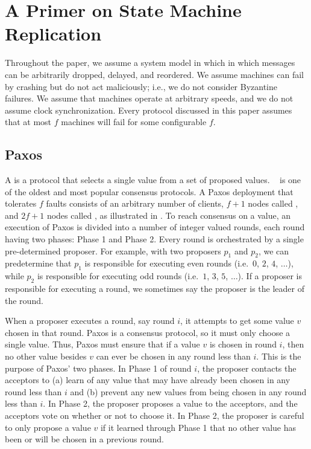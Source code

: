 \section{A Primer on State Machine Replication}

Throughout the paper, we assume a system model in which in which messages can
be arbitrarily dropped, delayed, and reordered. We assume machines can fail by
crashing but do not act maliciously; i.e., we do not consider Byzantine
failures. We assume that machines operate at arbitrary speeds, and we do not
assume clock synchronization. Every protocol discussed in this paper assumes
that at most $f$ machines will fail for some configurable $f$.

\subsection{Paxos}
A  is a protocol that selects a single value from a
set of proposed values. ~\cite{lamport1998part,
lamport2001paxos} is one of the oldest and most popular consensus protocols. A
Paxos deployment that tolerates $f$ faults consists of an arbitrary number of
clients, $f+1$ nodes called , and $2f+1$ nodes called
, as illustrated in .
%
To reach consensus on a value, an execution of Paxos is divided into a number
of integer valued rounds, each round having two phases: Phase 1 and Phase 2.
Every round is orchestrated by a single pre-determined proposer. For example,
with two proposers $p_1$ and $p_2$, we can predetermine that $p_1$ is
responsible for executing even rounds (i.e.\ $0$, $2$, $4$, $\ldots$), while
$p_2$ is responsible for executing odd rounds (i.e.\ $1$, $3$, $5$, $\ldots$).
If a proposer is responsible for executing a round, we sometimes say the
proposer is the leader of the round.

{}

When a proposer executes a round, say round $i$, it attempts to get some value
$v$ chosen in that round. Paxos is a consensus protocol, so it must only choose
a single value. Thus, Paxos must ensure that if a value $v$ is chosen in round
$i$, then no other value besides $v$ can ever be chosen in any round less than
$i$. This is the purpose of Paxos' two phases. In Phase 1 of round $i$, the
proposer contacts the acceptors to (a) learn of any value that may have already
been chosen in any round less than $i$ and (b) prevent any new values from
being chosen in any round less than $i$. In Phase 2, the proposer proposes a
value to the acceptors, and the acceptors vote on whether or not to choose it.
In Phase 2, the proposer is careful to only propose a value $v$ if it learned
through Phase 1 that no other value has been or will be chosen in a previous
round.

